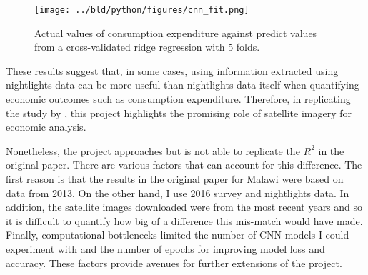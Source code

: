 \documentclass[11pt, a4paper, leqno]{article}
\begin{document}
\begin{figure}[H]
\centering
    \texttt{[image: ../bld/python/figures/cnn\_fit.png]}
    \caption{Actual values of consumption expenditure against predict values from a cross-validated ridge regression with 5 folds.}
    \label{fig:python-predictions}
\end{figure}

 These results suggest that, in some cases, using information extracted using nightlights data can be more useful than nightlights data itself when quantifying economic outcomes such as consumption expenditure. Therefore, in replicating the study by \citet{jean2016combining}, this project highlights the promising role of satellite imagery for economic analysis. 

 Nonetheless, the project approaches but is not able to replicate the $R^2$ in the original paper. There are various factors that can account for this difference. The first reason is that the results in the original paper for Malawi were based on data from 2013. On the other hand, I use 2016 survey and nightlights data. In addition, the satellite images downloaded were from the most recent years and so it is difficult to quantify how big of a difference this mis-match would have made. Finally, computational bottlenecks limited the number of CNN models I could experiment with and the number of epochs for improving model loss and accuracy. These factors provide avenues for further extensions of the project. 

\printbibliography
{}
\end{document}
